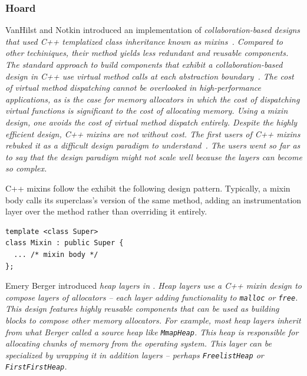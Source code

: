 \subsubsection{Hoard}
VanHilst and Notkin introduced an implementation of \em collaboration-based \em designs that used C++ templatized class inheritance known as \em mixins\em~\cite{Smaragdakis:2000:MPC:645417.652070}.  Compared to other techiniques, their method yields less redundant and reusable components.  The standard approach to build components that exhibit a collaboration-based design in C++ use virtual method calls at each abstraction boundary~\cite{Berger:2002:MMH:997313}.  The cost of virtual method dispatching cannot be overlooked in high-performance applications, as is the case for memory allocators in which the cost of dispatching virtual functions is significant to the cost of allocating memory.  Using a mixin design, one avoids the cost of virtual method dispatch entirely.  Despite the highly efficient design, C++ mixins are not without cost.  The first users of C++ mixins rebuked it as a difficult design paradigm to understand~\cite{Smaragdakis:2000:MPC:645417.652070}.  The users went so far as to say that the design paradigm might not scale well because the layers can become so complex.

C++ mixins follow the exhibit the following design pattern.  Typically, a mixin body calls its superclass's version of the same method, adding an instrumentation layer over the method rather than overriding it entirely.

\begin{verbatim}
template <class Super> 
class Mixin : public Super {
  ... /* mixin body */
};
\end{verbatim}

Emery Berger introduced \em heap layers \em in \cite{Berger:2002:MMH:997313}.  Heap layers use a C++ mixin design to compose layers of allocators -- each layer adding functionality to \verb,malloc, or \verb,free,.  This design features highly reusable components that can be used as building blocks to compose other memory allocators.  For example, most heap layers inherit from what Berger called a \em source heap \em like \verb,MmapHeap,.  This heap is responsible for allocating chunks of memory from the operating system.  This layer can be specialized by wrapping it in addition layers -- perhaps \verb,FreelistHeap, or \verb,FirstFirstHeap,.


